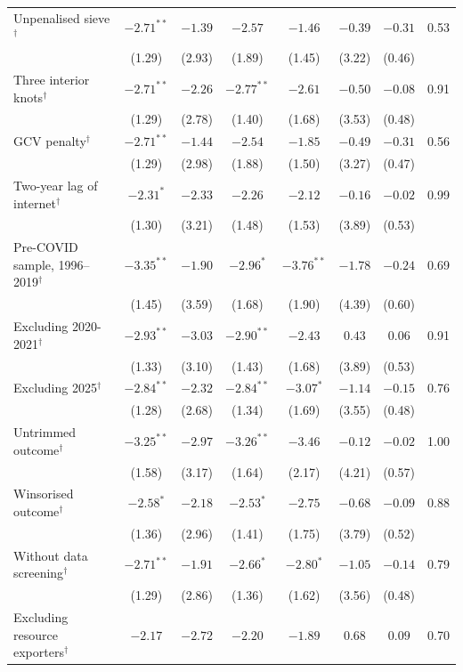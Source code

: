 \documentclass[preprint,12pt,authoryear]{elsarticle}
\begin{document}
\begin{table}[!p]
\begin{threeparttable}
\begin{tabular}{lccccccc}
\quad Unpenalised sieve$^{\dagger}$ & $-2.71^{**}$ & $-1.39$ & $-2.57$ & $-1.46$ & $-0.39$ & $-0.31$ & 0.53\\
 & (1.29) & (2.93) & (1.89) & (1.45) & (3.22) & (0.46) & \\
\quad Three interior knots$^{\dagger}$ & $-2.71^{**}$ & $-2.26$ & $-2.77^{**}$ & $-2.61$ & $-0.50$ & $-0.08$ & 0.91\\
 & (1.29) & (2.78) & (1.40) & (1.68) & (3.53) & (0.48) & \\
\quad GCV penalty$^{\dagger}$ & $-2.71^{**}$ & $-1.44$ & $-2.54$ & $-1.85$ & $-0.49$ & $-0.31$ & 0.56\\
 & (1.29) & (2.98) & (1.88) & (1.50) & (3.27) & (0.47) & \\
\quad Two-year lag of internet$^{\dagger}$ & $-2.31^{*}$ & $-2.33$ & $-2.26$ & $-2.12$ & $-0.16$ & $-0.02$ & 0.99\\
 & (1.30) & (3.21) & (1.48) & (1.53) & (3.89) & (0.53) & \\
\quad Pre-COVID sample, 1996--2019$^{\dagger}$ & $-3.35^{**}$ & $-1.90$ & $-2.96^{*}$ & $-3.76^{**}$ & $-1.78$ & $-0.24$ & 0.69\\
 & (1.45) & (3.59) & (1.68) & (1.90) & (4.39) & (0.60) & \\
\quad Excluding 2020-2021$^{\dagger}$ & $-2.93^{**}$ & $-3.03$ & $-2.90^{**}$ & $-2.43$ & $0.43$ & $0.06$ & 0.91\\
 & (1.33) & (3.10) & (1.43) & (1.68) & (3.89) & (0.53) & \\
\quad Excluding 2025$^{\dagger}$ & $-2.84^{**}$ & $-2.32$ & $-2.84^{**}$ & $-3.07^{*}$ & $-1.14$ & $-0.15$ & 0.76\\
 & (1.28) & (2.68) & (1.34) & (1.69) & (3.55) & (0.48) & \\
\quad Untrimmed outcome$^{\dagger}$ & $-3.25^{**}$ & $-2.97$ & $-3.26^{**}$ & $-3.46$ & $-0.12$ & $-0.02$ & 1.00\\
 & (1.58) & (3.17) & (1.64) & (2.17) & (4.21) & (0.57) & \\
\quad Winsorised outcome$^{\dagger}$ & $-2.58^{*}$ & $-2.18$ & $-2.53^{*}$ & $-2.75$ & $-0.68$ & $-0.09$ & 0.88\\
 & (1.36) & (2.96) & (1.41) & (1.75) & (3.79) & (0.52) & \\
\quad Without data screening$^{\dagger}$ & $-2.71^{**}$ & $-1.91$ & $-2.66^{*}$ & $-2.80^{*}$ & $-1.05$ & $-0.14$ & 0.79\\
 & (1.29) & (2.86) & (1.36) & (1.62) & (3.56) & (0.48) & \\
\quad Excluding resource exporters$^{\dagger}$ & $-2.17$ & $-2.72$ & $-2.20$ & $-1.89$ & $0.68$ & $0.09$ & 0.70\\

\end{tabular}
\end{threeparttable}
\end{table}
\end{document}
